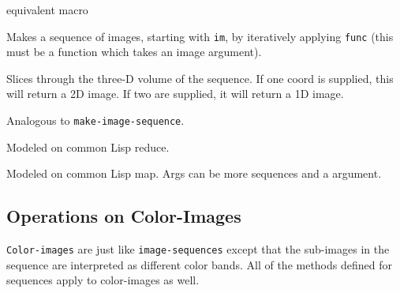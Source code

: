 \begin{description}
\item{}
\item{}
equivalent macro 

\item{}
Makes a sequence of images, starting with {\tt im}, by iteratively
applying {\tt func} (this must be a function which takes an image
argument).

\item{}
Slices through the three-D volume of the sequence.  If one coord is
supplied, this will return a 2D image.  If two are supplied, it will
return a 1D image.

\item{}
Analogous to {\tt make-image-sequence}.

\item{} 
Modeled on common Lisp reduce.

\item{}
Modeled on common Lisp map.  Args can be more sequences and a \res
argument.
\end{description}


\subsection{Operations on Color-Images}

{\tt Color-images} are just like {\tt image-sequences} except that
the sub-images in the sequence are interpreted as different color
bands.  All of the methods defined for sequences apply to color-images
as well.

